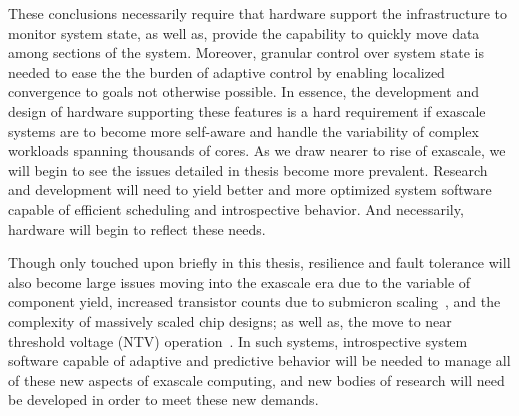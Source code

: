 These conclusions necessarily require that hardware support the infrastructure to monitor system state, as well as, provide the capability to quickly move data among sections of the system. Moreover, granular control over system state is needed to ease the the burden of adaptive control by enabling localized convergence to goals not otherwise possible. In essence, the development and design of hardware supporting these features is a hard requirement if exascale systems are to become more self-aware and handle the variability of complex workloads spanning thousands of cores. As we draw nearer to rise of exascale, we will begin to see the issues detailed in thesis become more prevalent. Research and development will need to yield better and more optimized system software capable of efficient scheduling and introspective behavior. And necessarily, hardware will begin to reflect these needs.

Though only touched upon briefly in this thesis, resilience and fault tolerance will also become large issues moving into the exascale era due to the variable of component yield, increased transistor counts due to submicron scaling~\cite{Jouppi2009}, and the complexity of massively scaled chip designs; as well as, the move to near threshold voltage (NTV) operation~\cite{AmarasingheEtAl2011,Borkar2011}. In such systems, introspective system software capable of adaptive and predictive behavior will be needed to manage all of these new aspects of exascale computing, and new bodies of research will need be developed in order to meet these new demands.
